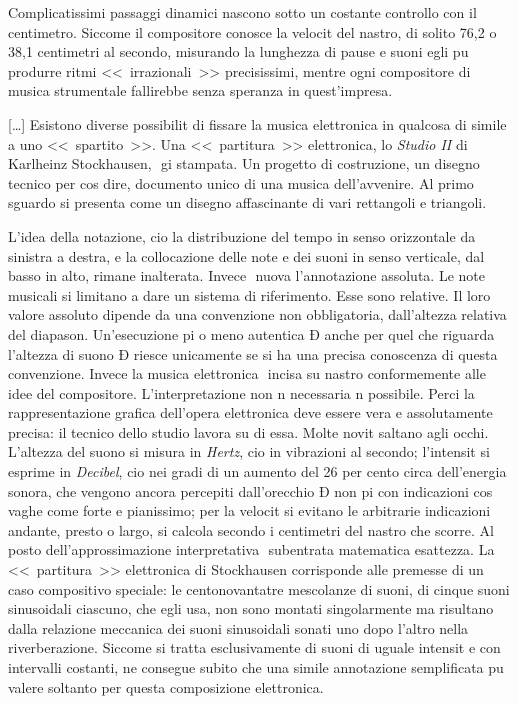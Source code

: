 Complicatissimi passaggi dinamici nascono sotto un costante controllo con il centimetro. Siccome il compositore conosce la velocit del nastro, di solito 76,2 o 38,1 centimetri al secondo, misurando la lunghezza di pause e suoni egli pu produrre ritmi <<~irrazionali~>> precisissimi, mentre ogni compositore di musica strumentale fallirebbe senza speranza in quest'impresa.


[\ldots] Esistono diverse possibilit di fissare la musica elettronica in qualcosa di simile a uno <<~spartito~>>. Una <<~partitura~>> elettronica, lo \emph{Studio II} di Karlheinz Stockhausen,  gi stampata. Un progetto di costruzione, un disegno tecnico per cos dire, documento unico di una musica dell'avvenire. Al primo sguardo si presenta come un disegno affascinante di vari rettangoli e triangoli.

L'idea della notazione, cio la distribuzione del tempo in senso orizzontale da sinistra a  destra, e la collocazione delle note e dei suoni in senso verticale, dal basso in alto, rimane inalterata. Invece  nuova l'annotazione assoluta. Le note musicali si limitano a dare un sistema di riferimento. Esse sono relative. Il loro valore assoluto dipende da una convenzione non obbligatoria, dall'altezza relativa del diapason. Un'esecuzione pi o meno autentica Ð anche per quel che riguarda l'altezza di suono Ð riesce unicamente se si ha una precisa conoscenza di questa convenzione. Invece la musica elettronica  incisa su nastro conformemente alle idee del compositore. L'interpretazione non  n necessaria n possibile. Perci la rappresentazione grafica dell'opera elettronica deve essere vera e assolutamente precisa: il tecnico dello studio lavora su  di essa. Molte novit saltano agli occhi. L'altezza del suono si misura in \emph{Hertz}, cio in vibrazioni al secondo; l'intensit si esprime in \emph{Decibel}, cio nei gradi di un aumento del 26 per cento circa dell'energia sonora, che vengono ancora percepiti dall'orecchio Ð non pi con indicazioni cos vaghe come forte e pianissimo; per la velocit si evitano le arbitrarie indicazioni andante, presto o largo, si calcola secondo i centimetri del nastro che scorre. Al posto dell'approssimazione interpretativa  subentrata matematica esattezza. La <<~partitura~>> elettronica di Stockhausen corrisponde alle premesse di un caso compositivo speciale: le centonovantatre mescolanze di suoni, di cinque suoni sinusoidali ciascuno, che egli usa, non sono montati singolarmente ma risultano dalla relazione meccanica dei suoni sinusoidali sonati uno dopo l'altro nella riverberazione. Siccome si tratta esclusivamente di  suoni di uguale intensit e con intervalli costanti, ne consegue subito che una simile annotazione semplificata pu valere soltanto  per questa composizione elettronica.

